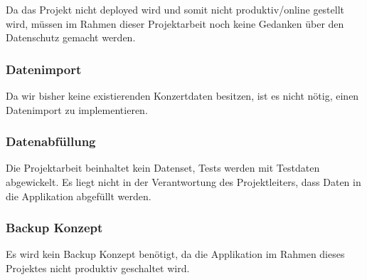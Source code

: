 Da das Projekt nicht deployed wird und somit nicht produktiv/online
gestellt wird, müssen im Rahmen dieser Projektarbeit noch keine Gedanken
über den Datenschutz gemacht werden.

\subsubsection{Datenimport}\label{datenimport}

Da wir bisher keine existierenden Konzertdaten besitzen, ist es nicht
nötig, einen Datenimport zu implementieren.

\subsubsection{Datenabfüllung}\label{datenabfuxfcllung}

Die Projektarbeit beinhaltet kein Datenset, Tests werden mit Testdaten
abgewickelt. Es liegt nicht in der Verantwortung des Projektleiters,
dass Daten in die Applikation abgefüllt werden.

\subsubsection{Backup Konzept}\label{backup-konzept}

Es wird kein Backup Konzept benötigt, da die Applikation im Rahmen
dieses Projektes nicht produktiv geschaltet wird.
